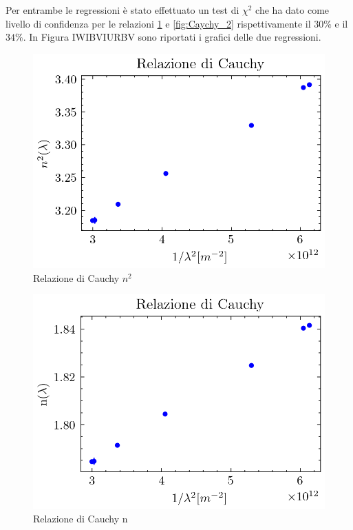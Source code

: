 \documentclass{article}
\begin{document}
        Per entrambe le regressioni è stato effettuato un test di $\chi^2$ che ha dato come livello di confidenza per le relazioni 
        \ref{fig:Cauchy_1} e \ref{fig:Caychy_2} rispettivamente il $30\%$ e il $34\%$. 
        In Figura IWIBVIURBV sono riportati i grafici delle due regressioni. 

        \begin{figure}

            \centering
            \includegraphics{../images/Cauchy_1.png}
            \caption{Relazione di Cauchy $n^2$}
            \label{fig:Cauchy_1}

        \end{figure}

        \begin{figure}

            \centering
            \includegraphics{../images/Cauchy_2.png}
            \caption{Relazione di Cauchy n}
            \label{fig:Cauchy_2}

        \end{figure}
\end{document}
